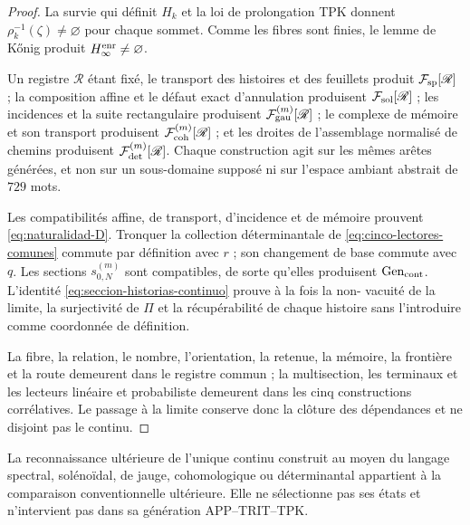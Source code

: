 \begin{proof}
La survie qui définit \(H_k\) et la loi de prolongation TPK donnent
\(\rho_k^{-1}(\zeta)\neq\varnothing\) pour chaque sommet. Comme les fibres sont
finies, le lemme de Kőnig produit \(H_\infty^{\rm enr}\neq\varnothing\).

Un registre \(\mathscr R\) étant fixé, le transport des histoires et des feuillets produit \(\mathcal F_{\rm sp}[\mathscr R]\) ; la composition affine et le défaut exact d'annulation produisent \(\mathcal F_{\rm sol}[\mathscr R]\) ; les incidences et la suite rectangulaire produisent \(\mathcal F_{\rm gau}^{(m)}[\mathscr R]\) ; le complexe de mémoire et son transport produisent \(\mathcal F_{\rm coh}^{(m)}[\mathscr R]\) ; et les droites de l'assemblage normalisé de chemins produisent \(\mathcal F_{\rm det}^{(m)}[\mathscr R]\). Chaque construction agit sur les mêmes arêtes générées, et non sur un sous-domaine supposé ni sur l'espace ambiant abstrait de \(729\) mots.

Les compatibilités affine, de transport, d’incidence et de mémoire prouvent
\eqref{eq:naturalidad-D}. Tronquer la collection déterminantale de
\eqref{eq:cinco-lectores-comunes} commute par
définition avec \(r\) ; son changement de base commute avec \(q\). Les sections
\(s_{0,N}^{(m)}\) sont compatibles, de sorte qu’elles produisent
\(\operatorname{Gen}_{\rm cont}\). L’identité
\eqref{eq:seccion-historias-continuo} prouve à la fois la non-
vacuité de la limite, la surjectivité de \(\Pi\) et la récupérabilité de chaque
histoire sans l’introduire comme coordonnée de définition.


La fibre, la relation, le nombre, l'orientation, la retenue, la mémoire, la
frontière et la route demeurent dans le registre commun ; la multisection, les
terminaux et les lecteurs linéaire et probabiliste demeurent dans les cinq
constructions corrélatives. Le passage à la limite conserve donc la clôture des
dépendances et ne disjoint pas le continu.
\end{proof}

La reconnaissance ultérieure de l'unique continu construit au moyen du langage spectral, solénoïdal, de jauge, cohomologique ou déterminantal appartient à la comparaison conventionnelle ultérieure. Elle ne sélectionne pas ses états et n'intervient pas dans sa génération APP--TRIT--TPK.

